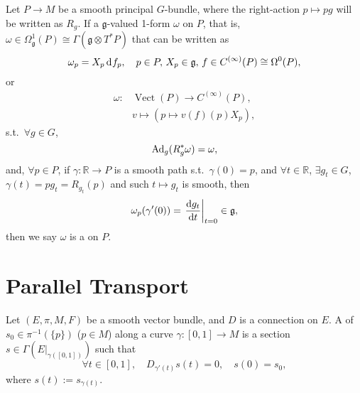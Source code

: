 \documentclass[openany, oneside, a5paper]{book}
\DeclareMathOperator{\Vect}{Vect}
\begin{document}
\begin{definition}
    Let $P \to M$ be a smooth principal $G$-bundle, where the right-action $p \mapsto p g$ will be written as $R_g$.
    If a $\mathfrak g$-valued 1-form $\omega$ on $P$, that is, $\omega \in \Omega^1_{\mathfrak g}(P) \cong \Gamma(\mathfrak g \otimes T^*P)$ that can be written as
    \begin{equation}
        \omega_p = X_p \mathop{}\!\mathrm{d}^{} f_p,
        \quad 
        p \in P, \,
        X_p \in \mathfrak g,\,
        f \in C^{(\infty)}(P) \cong \Omega^0(P),
    \end{equation}
    or
    \begin{equation}
    \begin{aligned}
        \omega \colon & \Vect(P) \to C^{(\infty)}(P),
        \\
        & v \mapsto (p \mapsto v(f)(p) X_p),
    \end{aligned}
    \end{equation}
    s.t.\ 
    $\forall g \in G$, 
    \begin{equation}
        \operatorname{Ad}_g(R^*_g \omega) = \omega,
    \end{equation}
    and, $\forall p \in P$, if $\gamma \colon \mathbb R \to P$ is a smooth path s.t.\ $\gamma(0) = p$, and $\forall t \in \mathbb R$, $\exists g_t \in G$, $\gamma(t) = p g_t = R_{g_t}(p)$ and such $t \mapsto g_t$ is smooth, then
    \begin{equation}
        \omega_p(\gamma'(0)) = \left.
            \diff {g_t} t
        \right|_{t = 0} \in \mathfrak g, 
    \end{equation}
    then we say $\omega$ is a  on $P$.
\end{definition}

\section{Parallel Transport}

\begin{definition}
    Let $(E, \pi, M, F)$ be a smooth vector bundle, and $D$ is a connection on $E$.
    A \indexbf{paralell transport} of $s_0 \in \pi^{-1}(\{p\})$ ($p \in M$) along a curve $\gamma \colon [0, 1] \to M$ is a section $s \in \Gamma(E|_{\gamma([0, 1])})$ such that
    \begin{equation}\label{eq: paralell transport}
        \forall t \in [0, 1], 
        \quad 
        D_{\gamma'(t)} s(t) = 0,
        \quad
        s(0) = s_0,
    \end{equation}
    where $s(t) := s_{\gamma(t)}$.
\end{definition}
\end{document}
